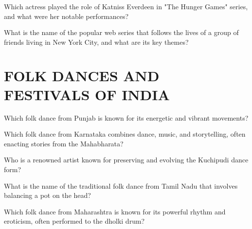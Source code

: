 \documentclass[12pt,a4paper]{book}
\begin{document}
\begin{enhancedmcq}[Question 49]{Which actress played the role of Katniss Everdeen in "The Hunger Games" series, and what were her notable performances?}
\end{enhancedmcq}

\begin{enhancedmcq}[Question 50]{What is the name of the popular web series that follows the lives of a group of friends living in New York City, and what are its key themes?}
\end{enhancedmcq}


\section{FOLK DANCES AND FESTIVALS OF INDIA}

\begin{enhancedmcq}[Question 1]{Which folk dance from Punjab is known for its energetic and vibrant movements?}
\end{enhancedmcq}

\begin{enhancedmcq}[Question 2]{Which folk dance from Karnataka combines dance, music, and storytelling, often enacting stories from the Mahabharata?}
\end{enhancedmcq}

\begin{enhancedmcq}[Question 3]{Who is a renowned artist known for preserving and evolving the Kuchipudi dance form?}
\end{enhancedmcq}

\begin{enhancedmcq}[Question 4]{What is the name of the traditional folk dance from Tamil Nadu that involves balancing a pot on the head?}
\end{enhancedmcq}

\begin{enhancedmcq}[Question 5]{Which folk dance from Maharashtra is known for its powerful rhythm and eroticism, often performed to the dholki drum?}
\end{enhancedmcq}
\end{document}
